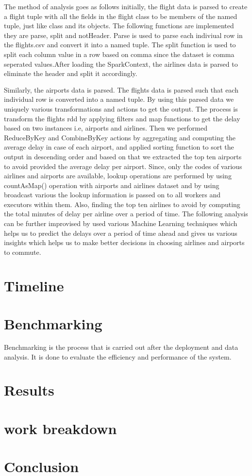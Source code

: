 \documentclass[9pt,twocolumn,twoside]{../../styles/osajnl}
\begin{document}
The method of analysis goes as follows initially, the flight data is
parsed to create a flight tuple with all the fields in the flight
class to be members of the named tuple, just like class and its
objects. The following functions are implemented they are parse, split
and notHeader. Parse is used to parse each indiviual row in the
flights.csv and convert it into a named tuple. The split function is
used to split each column value in a row based on comma since the
dataset is comma seperated values.After loading the SparkContext, the
airlines data is parsed to eliminate the header and split it
accordingly.

Similarly, the airports data is parsed.  The flights data is parsed
such that each individual row is converted into a named tuple.  By
using this parsed data we uniquely various transformations and actions
to get the output. The process is transform the flights rdd by
applying filters and map functions to get the delay based on two
instances i.e, airports and airlines. Then we performed ReduceByKey
and CombineByKey actions by aggregating and computing the average
delay in case of each airport, and applied sorting function to sort
the output in descending order and based on that we extracted the top
ten airports to avoid provided the average delay per airport. Since,
only the codes of various airlines and airports are available, lookup
operations are performed by using countAsMap() operation with airports
and airlines dataset and by using broadcast various the lookup
information is passed on to all workers and executors within
them. Also, finding the top ten airlines to avoid by computing the
total minutes of delay per airline over a period of time. The
following analysis can be further improvised by used various Machine
Learning techniques which helps us to predict the delays over a period
of time ahead and gives us various insights which helps us to make
better decisions in choosing airlines and airports to commute.


\section{Timeline}


\section{Benchmarking}

Benchmarking is the process that is carried out after the deployment
and data analysis. It is done to evaluate the efficiency and
performance of the system.



\section{Results}

\section{work breakdown} 

\section{Conclusion} 




\end{document}
